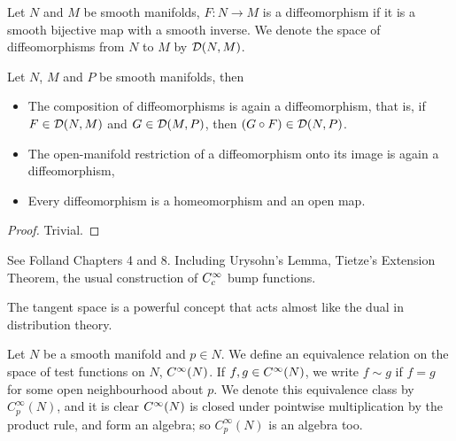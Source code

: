 \documentclass[../main-manifolds.tex]{subfiles}
\begin{document}
\begin{definition}\label{lee-chp2:diffeomorphism-definition}
    Let $N$ and $M$ be smooth manifolds, $F:N\to M$ is a diffeomorphism if it is a smooth bijective map with a smooth inverse. We denote the space of diffeomorphisms from $N$ to $M$ by $\diffeo[N,M]$.
\end{definition}

\begin{wts}\label{lee-chp2-diffeomorphism-properties}
    Let $N$, $M$ and $P$ be smooth manifolds, then
    \begin{itemize}
        \item The composition of diffeomorphisms is again a diffeomorphism, that is, if $F\in \diffeo[N,M]$ and $G\in \diffeo[M,P]$, then $(G\circ F)\in \diffeo[N,P]$.
        \item The open-manifold restriction of a diffeomorphism onto its image is again a diffeomorphism,
        \item Every diffeomorphism is a homeomorphism and an open map.
    \end{itemize}
\end{wts}
\begin{proof}
    Trivial.
\end{proof}

See Folland Chapters 4 and 8. Including Urysohn's Lemma, Tietze's Extension Theorem, the usual construction of $C_c^\infty$ bump functions.
\newpage

\newpage
{}
The tangent space is a powerful concept that acts almost like the dual in distribution theory.
\begin{definition}\label{lee-chp3:algebra-of-germs-at-p}
    Let $N$ be a smooth manifold and $p\in N$. We define an equivalence relation on the space of test functions on $N$, $\cinf[N]$. If $f,g\in\cinf[N]$, we write $f\sim g$ if $f=g$ for some open neighbourhood about $p$. We denote this equivalence class by $C_p^\infty(N)$, and it is clear $\cinf[N]$ is closed under pointwise multiplication by the product rule, and form an algebra; so $C_p^\infty(N)$ is an algebra too.
\end{definition}
\end{document}
